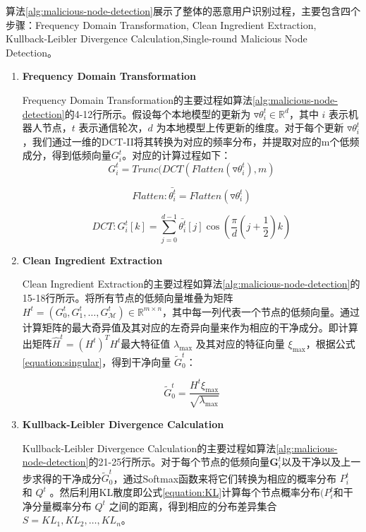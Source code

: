 \documentclass[lettersize,journal]{IEEEtran}
\begin{document}
算法\ref{alg:malicious-node-detection}展示了整体的恶意用户识别过程，主要包含四个步骤：Frequency Domain Transformation, Clean Ingredient Extraction, Kullback-Leibler Divergence Calculation,Single-round Malicious Node Detection。
\begin{enumerate}
\item \textbf{Frequency Domain Transformation}

Frequency Domain Transformation的主要过程如算法\ref{alg:malicious-node-detection}的4-12行所示。假设每个本地模型的更新为 \(\triangledown \theta_i^t \in \mathbb{R}^d\)，其中 \(i\) 表示机器人节点，\(t\) 表示通信轮次，\(d\) 为本地模型上传更新的维度。对于每个更新 \(\triangledown \theta_i^t\)，我们通过一维的DCT-II将其转换为对应的频率分布，并提取对应的m个低频成分，得到低频向量\(G_i^t\)。对应的计算过程如下：
\begin{equation}
G_i^t = Trunc(DCT(Flatten(\triangledown \theta_i^t), m)
\end{equation}

\begin{equation}
Flatten: \bar{\theta_i^t} = Flatten(\triangledown \theta_i^t)
\end{equation}

\begin{equation}
DCT: G_i^t[k] = \sum_{j=0}^{d-1} \bar{\theta_i^t}[j] \cos \left( \frac{\pi}{d} \left(j + \frac{1}{2}\right) k \right)
\end{equation}

\item \textbf{Clean Ingredient Extraction}

Clean Ingredient Extraction的主要过程如算法\ref{alg:malicious-node-detection}的15-18行所示。将所有节点的低频向量堆叠为矩阵 \(H^t = ({G_0^t}, {G_1^t}, \ldots, {G_{\mathcal{M}}^t}) \in \mathbb{R}^{m \times n}\)，其中每一列代表一个节点的低频向量。通过计算矩阵的最大奇异值及其对应的左奇异向量来作为相应的干净成分。即计算出矩阵\(\hat{H}^t = (H^t)^{T} H^t\)最大特征值 \(\lambda_{\text{max}}\) 及其对应的特征向量 \(\xi_{\text{max}}\)，根据公式\ref{equation:singular}，得到干净向量 \(\tilde{G}_0^t\)：

\begin{equation}
\tilde{G}^t_0 = \frac{H^t \xi_{\text{max}}}{\sqrt{\lambda_{\text{max}}}}
\label{equation:singular}
\end{equation}


\item \textbf{Kullback-Leibler Divergence Calculation}

Kullback-Leibler Divergence Calculation的主要过程如算法\ref{alg:malicious-node-detection}的21-25行所示。对于每个节点的低频向量\(\mathbf{G}_i^t\)以及干净以及上一步求得的干净成分\(\tilde{G}^t_0\)，通过Softmax函数来将它们转换为相应的概率分布 \(P_i^t\) 和 \(Q^t\) 。然后利用KL散度即公式\ref{equation:KL}计算每个节点概率分布\((P_i^t\)和干净分量概率分布 \(Q^t\) 之间的距离，得到相应的分布差异集合\(S = {{KL}}_1, {{KL}}_2, \ldots, {{KL}}_n\)。


\end{enumerate}
\end{document}
